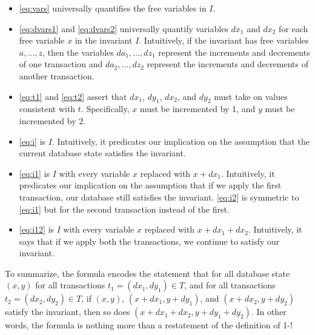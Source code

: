 \begin{itemize}
  \item
    \eqref{eq:vars} universally quantifies the free variables in $I$.

  \item
    \eqref{eq:dvars1} and \eqref{eq:dvars2} universally quantify variables
    $dx_1$ and $dx_2$ for each free variable $x$ in the invariant $I$.
    Intuitively, if the invariant has free variables $a, \ldots, z$, then the
    variables $da_1, \ldots, dz_1$ represent the increments and decrements of
    one transaction and $da_2, \ldots, dz_2$ represent the increments and
    decrements of another transaction.

  \item
    \eqref{eq:t1} and \eqref{eq:t2} assert that $dx_1$, $dy_1$, $dx_2$, and
    $dy_2$ must take on values consistent with $t$. Specifically, $x$ must be
    incremented by 1, and $y$ must be incremented by $2$.

  \item
    \eqref{eq:i} is $I$. Intuitively, it predicates our implication on the
    assumption that the current database state satisfies the invariant.

  \item
    \eqref{eq:i1} is $I$ with every variable $x$ replaced with $x + dx_1$.
    Intuitively, it predicates our implication on the assumption that if we
    apply the first transaction, our database still satisfies the invariant.
    \eqref{eq:i2} is symmetric to \eqref{eq:i1} but for the second transaction
    instead of the first.

  \item
    \eqref{eq:i12} is $I$ with every variable $x$ replaced with $x + dx_1 +
    dx_2$. Intuitively, it says that if we apply both the transactions, we
    continue to satisfy our invariant.
\end{itemize}

To summarize, the formula encodes the statement that for all database state
$(x, y)$ for all transactions $t_1 = (dx_1, dy_1) \in T$, and for all
transactions $t_2 = (dx_2, dy_2) \in T$, if $(x, y)$, $(x + dx_1, y + dy_1)$,
and $(x + dx_2, y + dy_2)$ satisfy the invariant, then so does $(x + dx_1 +
dx_2, y + dy_1 + dy_2)$. In other words, the formula is nothing more than a
restatement of the definition of 1-\iconfluence!

\newcommand{\imp}{$\iinvariant$MP}
